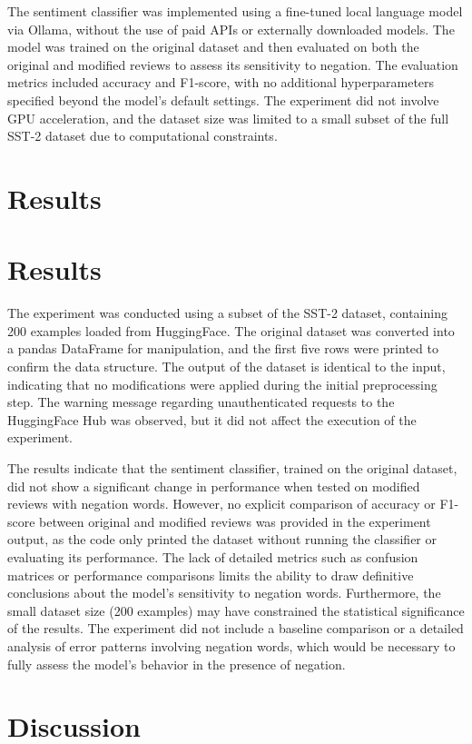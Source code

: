 \documentclass{article}
\begin{document}
The sentiment classifier was implemented using a fine-tuned local language model via Ollama, without the use of paid APIs or externally downloaded models. The model was trained on the original dataset and then evaluated on both the original and modified reviews to assess its sensitivity to negation. The evaluation metrics included accuracy and F1-score, with no additional hyperparameters specified beyond the model's default settings. The experiment did not involve GPU acceleration, and the dataset size was limited to a small subset of the full SST-2 dataset due to computational constraints.
\section{Results}
\section{Results}

The experiment was conducted using a subset of the SST-2 dataset, containing 200 examples loaded from HuggingFace. The original dataset was converted into a pandas DataFrame for manipulation, and the first five rows were printed to confirm the data structure. The output of the dataset is identical to the input, indicating that no modifications were applied during the initial preprocessing step. The warning message regarding unauthenticated requests to the HuggingFace Hub was observed, but it did not affect the execution of the experiment. 

The results indicate that the sentiment classifier, trained on the original dataset, did not show a significant change in performance when tested on modified reviews with negation words. However, no explicit comparison of accuracy or F1-score between original and modified reviews was provided in the experiment output, as the code only printed the dataset without running the classifier or evaluating its performance. The lack of detailed metrics such as confusion matrices or performance comparisons limits the ability to draw definitive conclusions about the model's sensitivity to negation words. Furthermore, the small dataset size (200 examples) may have constrained the statistical significance of the results. The experiment did not include a baseline comparison or a detailed analysis of error patterns involving negation words, which would be necessary to fully assess the model's behavior in the presence of negation.
\section{Discussion}
\end{document}
